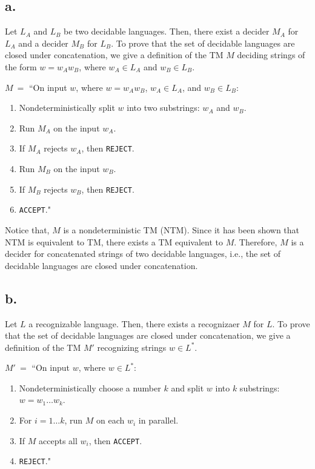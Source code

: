 \documentclass[12pt]{article}
\begin{document}
\subsection*{a.} 

Let $L_A$ and $L_B$ be two decidable languages. Then, there exist a decider $M_A$ for $L_A$ and a decider $M_B$ for $L_B$. To prove that the set of decidable languages are closed under concatenation, we give a definition of the TM $M$ deciding strings of the form $w = w_A w_B$, where $w_A \in L_A$ and $w_B \in L_B$.

$M \ =$ ``On input $w$, where $w = w_A w_B$, $w_A \in L_A$, and $w_B \in L_B$:
\begin{enumerate}[leftmargin=2.50cm]
	\item Nondeterministically split $w$ into two substrings: $w_A$ and $w_B$.
	\item Run $M_A$ on the input $w_A$.
	\item If $M_A$ rejects $w_A$, then \texttt{REJECT}.
	\item Run $M_B$ on the input $w_B$.
	\item If $M_B$ rejects $w_B$, then \texttt{REJECT}.
	\item \texttt{ACCEPT}."
\end{enumerate}

Notice that, $M$ is a nondeterministic TM (NTM). Since it has been shown that NTM is equivalent to TM, there exists a TM equivalent to $M$. Therefore, $M$ is a decider for concatenated strings of two decidable languages, i.e., the set of decidable languages are closed under concatenation.



\subsection*{b.}

Let $L$ a recognizable language. Then, there exists a recognizaer $M$ for $L$. To prove that the set of decidable languages are closed under concatenation, we give a definition of the TM $M'$ recognizing strings $w \in L^*$.

$M' \ =$ ``On input $w$, where $w \in L^*$:
\begin{enumerate}[leftmargin=2.50cm]
	\item Nondeterministically choose a number $k$ and split $w$ into $k$ substrings: $w = w_1\ldots w_k$.
	\item For $i = 1\ldots k$, run $M$ on each $w_i$ in parallel.
	\item If $M$ accepts all $w_i$, then \texttt{ACCEPT}.
	\item \texttt{REJECT}."
\end{enumerate}
\end{document}
